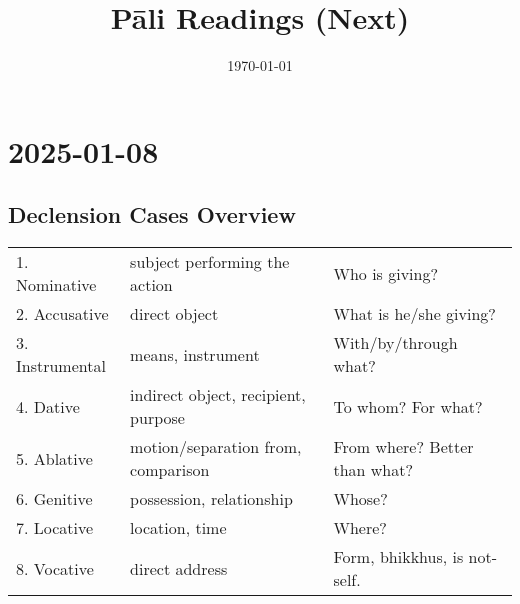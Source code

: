 \documentclass[11pt,oneside]{memoir}
\date{\today}
\title{Pāli Readings (Next)}
\begin{document}
\maketitle
\makeatletter

\newlength{\colOne}\setlength{\colOne}{0.35\linewidth}
\newlength{\colTwo}\setlength{\colTwo}{0.6\linewidth}

\renewenvironment{quote}%
{\list{}{%
    \doubleLineSize
    \listparindent 0pt
    \itemindent    0pt
    \leftmargin    3em
    \rightmargin   3em
    \parsep        0pt
    \topsep        8pt
    \partopsep     0pt}%
\item[] \raggedright}%
{\endlist}

\renewcommand*\sentenceDiaSolution[2][0.4]{%
  \ifanswerkey%
    \hspace*{-\spinemargin}%
    \begin{minipage}{\paperwidth}%
      \centering%
      \texttt{[image: \#2]}%
    \end{minipage}%
  \fi%
}

\makeatother

\mainmatter

\chapter{2025-01-08}
\label{sec:orgdad3103}
\section{Declension Cases Overview}
\label{sec:org9fc3db1}

\begin{tabular}{lll}
1. Nominative & subject performing the action & Who is giving?\\[0pt]
2. Accusative & direct object & What is he/she giving?\\[0pt]
3. Instrumental & means, instrument & With/by/through what?\\[0pt]
4. Dative & indirect object, recipient, purpose & To whom? For what?\\[0pt]
5. Ablative & motion/separation from, comparison & From where? Better than what?\\[0pt]
6. Genitive & possession, relationship & Whose?\\[0pt]
7. Locative & location, time & Where?\\[0pt]
8. Vocative & direct address & Form, bhikkhus, is not-self.\\[0pt]
\end{tabular}
\end{document}
